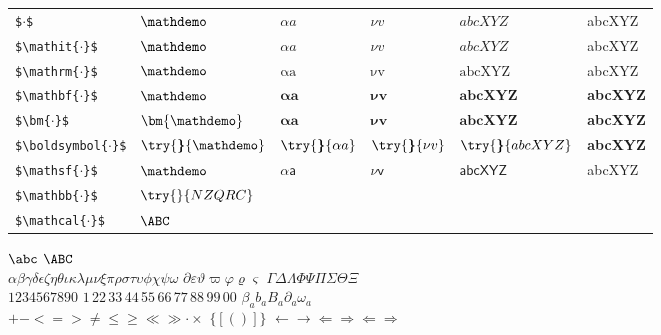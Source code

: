 \begin{tabular}{@{}llllll}
\texttt{\$$\cdot$\$} & $\mathdemo$ & $\alpha a$ & $\nu v$ & $abcXYZ$ & abcXYZ \\
\texttt{\$\textbackslash mathit\{$\cdot$\}\$} & $\mathit{\mathdemo}$ & $\mathit{\alpha a}$ & $\mathit{\nu v}$ & $\mathit{abcXYZ}$ & abcXYZ \\
\texttt{\$\textbackslash mathrm\{$\cdot$\}\$} & $\mathrm{\mathdemo}$ & $\mathrm{\alpha a}$ & $\mathrm{\nu v}$ & $\mathrm{abcXYZ}$ & abcXYZ \\
\texttt{\$\textbackslash mathbf\{$\cdot$\}\$} & $\mathbf{\mathdemo}$ & $\mathbf{\alpha a}$ & $\mathbf{\nu v}$ & $\mathbf{abcXYZ}$ & \textbf{abcXYZ} \\
\texttt{\$\textbackslash bm\{$\cdot$\}\$} & $\bm{\mathdemo}$ & $\bm{\alpha a}$ & $\bm{\nu v}$ & $\bm{abcXYZ}$ & \textbf{abcXYZ} \\
\texttt{\$\textbackslash boldsymbol\{$\cdot$\}\$} & $\try{\boldsymbol}{\mathdemo}$ & $\try{\boldsymbol}{\alpha a}$ & $\try{\boldsymbol}{\nu v}$ & $\try{\boldsymbol}{abcXYZ}$ & \textbf{abcXYZ} \\
\texttt{\$\textbackslash mathsf\{$\cdot$\}\$} & $\mathsf{\mathdemo}$ & $\mathsf{\alpha a}$ & $\mathsf{\nu v}$ & $\mathsf{abcXYZ}$ & abcXYZ \\
\texttt{\$\textbackslash mathbb\{$\cdot$\}\$} & \multicolumn{5}{l}{$\try{\mathbb}{NZQRC}$} \\
\texttt{\$\textbackslash mathcal\{$\cdot$\}\$} & \multicolumn{5}{l}{$\mathcal{\ABC}$} \\
\end{tabular}

$\abc$ \qquad $\ABC$\\
$\alpha\beta\gamma\delta\epsilon\zeta\eta\theta\iota\kappa\lambda\mu\nu\xi\pi\rho\sigma\tau\upsilon\phi\chi\psi\omega$ \qquad
$\partial\varepsilon\vartheta\varpi\varphi\varrho\varsigma$ \qquad
$\Gamma\Delta\Lambda\Phi\Psi\Pi\Sigma\Theta\Xi$\\
$1234567890$ $1$\,2$2$\,3$3$\,4$4$\,5$5$\,6$6$\,7$7$\,8$8$\,9$9$\,0$0$ \qquad
$\beta_a b_a B_a \partial_a \omega_a$ \\
$+ - <=> \ne \le \ge \ll \gg \cdot \times$ \qquad
$\{[()]\}$ \qquad
$\leftarrow \rightarrow \Leftarrow \Rightarrow \Longleftarrow \Longrightarrow$
